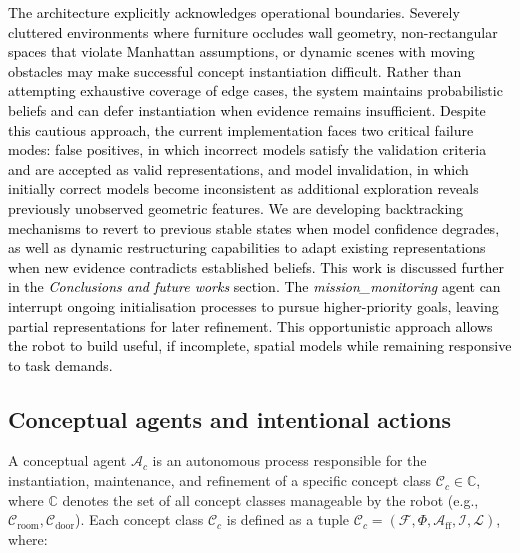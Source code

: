 \documentclass[10pt,a4paper]{article}
\begin{document}
\textcolor{black}{The architecture explicitly acknowledges operational boundaries. Severely cluttered environments where furniture occludes wall geometry, non-rectangular spaces that violate Manhattan assumptions, or dynamic scenes with moving obstacles may make successful concept instantiation difficult. Rather than attempting exhaustive coverage of edge cases, the system maintains probabilistic beliefs and can defer instantiation when evidence remains insufficient. \textcolor{black}{Despite this cautious approach, the current implementation faces two critical failure modes: false positives, in which incorrect models satisfy the validation criteria and are accepted as valid representations, and model invalidation, in which initially correct models become inconsistent as additional exploration reveals previously unobserved geometric features.} We are developing backtracking mechanisms to revert to previous stable states when model confidence degrades, as well as dynamic restructuring capabilities to adapt existing representations when new evidence contradicts established beliefs. This work is discussed further in the \textit{Conclusions and future works} section. The \textit{mission\_monitoring} agent can interrupt ongoing initialisation processes to pursue higher-priority goals, leaving partial representations for later refinement. This opportunistic approach allows the robot to build useful, if incomplete, spatial models while remaining responsive to task demands.}

\subsection{Conceptual agents and intentional actions} %

%
A conceptual agent \( \mathcal{A}_c \) is an autonomous process responsible for the instantiation, maintenance, and refinement of a specific concept class \( \mathcal{C}_c \in \mathbb{C} \), where \( \mathbb{C} \) denotes the set of all concept classes manageable by the robot (e.g., \( \mathcal{C}_{\text{room}}, \mathcal{C}_{\text{door}}\)). Each concept class \( \mathcal{C}_c  \) is defined as a tuple $\mathcal{C}_c  = \left( \mathcal{F}, \Phi, \mathcal{A}_{\text{ff}}, \mathcal{I}, \mathcal{L} \right)$, where:
\end{document}
